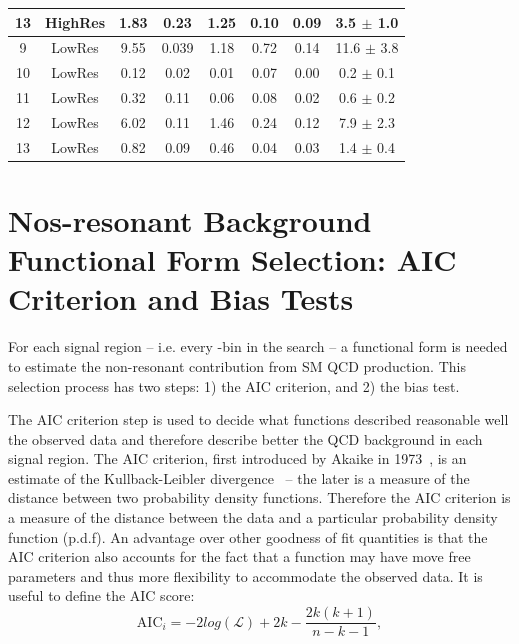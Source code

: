 \begin{table}[htb]
\begin{center}
\begin{tabular}{|c|c|c|c|c|c|c|c|}
13 & HighRes & 1.83  & 0.23   & 1.25   & 0.10   & 0.09    & 3.5 $\pm$ 1.0    \\    
\hline                                                                     
9  & LowRes & 9.55   & 0.039  & 1.18   & 0.72   & 0.14    & 11.6 $\pm$ 3.8   \\
10 & LowRes & 0.12   & 0.02   & 0.01   & 0.07   & 0.00    & 0.2 $\pm$ 0.1    \\
11 & LowRes & 0.32   & 0.11   & 0.06   & 0.08   & 0.02    & 0.6 $\pm$ 0.2    \\
12 & LowRes & 6.02   & 0.11   & 1.46   & 0.24   & 0.12    & 7.9 $\pm$ 2.3    \\
13 & LowRes & 0.82   & 0.09   & 0.46   & 0.04   & 0.03    & 1.4 $\pm$ 0.4    \\
\hline
\end{tabular}
\end{center}
\end{table}



\section{Nos-resonant Background Functional Form Selection: AIC
  Criterion and Bias Tests}
For each signal region -- i.e. every \MR-\Rtwo bin in the search -- a functional form is needed to estimate the non-resonant
contribution from SM QCD  production. This selection process has two
steps: 1) the AIC criterion, and 2) the bias test.

The AIC criterion step is used to decide what functions described
reasonable well the observed data and therefore describe better the
QCD background in each signal region. The AIC criterion, first
introduced by Akaike in 1973~\cite{AIC}, is an estimate of the
Kullback-Leibler divergence~\cite{kullback1951} -- the later is a measure of
the distance between two probability density functions. Therefore the
AIC criterion is a measure of the distance between the data and a
particular probability density function (p.d.f). An advantage over
other goodness of fit quantities is that the AIC criterion also
accounts for the fact that a function may have move free parameters
and thus more flexibility to accommodate the observed data. It is
useful to define the AIC score:
\begin{equation}
\label{eq:AIC}
\mathrm{AIC}_{i} = -2log(\mathcal{L}) + 2k -\frac{2k(k+1)}{n-k-1},
\end{equation}

